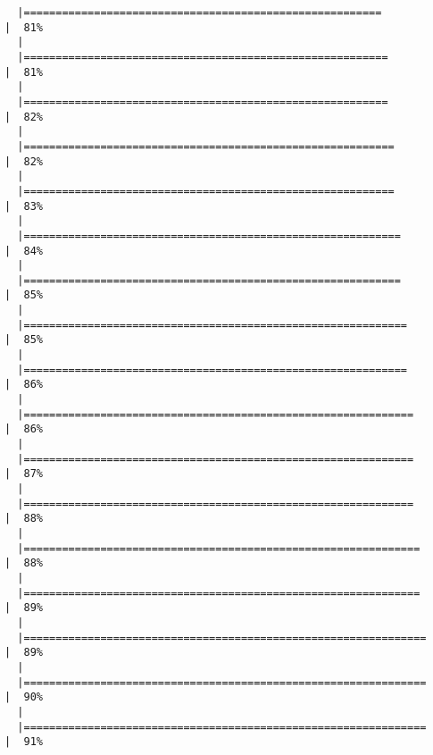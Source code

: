 \documentclass[
  letterpaper,
]{book}
\begin{document}
\begin{verbatim}
  |========================================================              |  81%
  |                                                                            
  |=========================================================             |  81%
  |                                                                            
  |=========================================================             |  82%
  |                                                                            
  |==========================================================            |  82%
  |                                                                            
  |==========================================================            |  83%
  |                                                                            
  |===========================================================           |  84%
  |                                                                            
  |===========================================================           |  85%
  |                                                                            
  |============================================================          |  85%
  |                                                                            
  |============================================================          |  86%
  |                                                                            
  |=============================================================         |  86%
  |                                                                            
  |=============================================================         |  87%
  |                                                                            
  |=============================================================         |  88%
  |                                                                            
  |==============================================================        |  88%
  |                                                                            
  |==============================================================        |  89%
  |                                                                            
  |===============================================================       |  89%
  |                                                                            
  |===============================================================       |  90%
  |                                                                            
  |===============================================================       |  91%

\end{verbatim}
\end{document}
